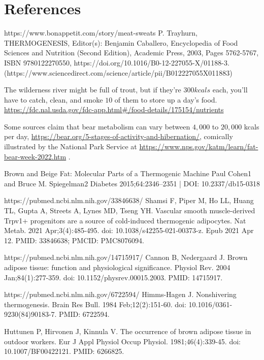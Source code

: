 \documentclass[12pt]{iopart}
\begin{document}
\section*{References}
\begin{thebibliography}{99}

https://www.bonappetit.com/story/meat-sweats
P. Trayhurn,
THERMOGENESIS,
Editor(s): Benjamin Caballero,
Encyclopedia of Food Sciences and Nutrition (Second Edition),
Academic Press,
2003,
Pages 5762-5767,
ISBN 9780122270550,
https://doi.org/10.1016/B0-12-227055-X/01188-3.
(https://www.sciencedirect.com/science/article/pii/B012227055X011883)

The wilderness river might be full of trout, but if they're $300kcals$ each, you'll have to catch, clean, and smoke $10$ of them to store up a day's food. \url{https://fdc.nal.usda.gov/fdc-app.html#/food-details/175154/nutrients}

Some sources claim that bear metabolism can vary between $4,000$ to $20,000$ kcals per day, \url{https://bear.org/5-stages-of-activity-and-hibernation/}, comically illustrated by the National Park Service at \url{https://www.nps.gov/katm/learn/fat-bear-week-2022.htm} .


Brown and Beige Fat: Molecular Parts of a Thermogenic Machine
Paul Cohen1 and Bruce M. Spiegelman2
Diabetes 2015;64:2346–2351 | DOI: 10.2337/db15-0318

https://pubmed.ncbi.nlm.nih.gov/33846638/
Shamsi F, Piper M, Ho LL, Huang TL, Gupta A, Streets A, Lynes MD, Tseng YH. 
Vascular smooth muscle-derived Trpv1+ progenitors are a source of cold-induced thermogenic adipocytes. Nat Metab. 2021 Apr;3(4):485-495. 
doi: 10.1038/s42255-021-00373-z. Epub 2021 Apr 12. PMID: 33846638; PMCID: PMC8076094.

https://pubmed.ncbi.nlm.nih.gov/14715917/
Cannon B, Nedergaard J. Brown adipose tissue: function and physiological significance. Physiol Rev. 2004 Jan;84(1):277-359. 
doi: 10.1152/physrev.00015.2003. PMID: 14715917.

https://pubmed.ncbi.nlm.nih.gov/6722594/
Himms-Hagen J. Nonshivering thermogenesis. Brain Res Bull. 1984 Feb;12(2):151-60. 
doi: 10.1016/0361-9230(84)90183-7. PMID: 6722594.

Huttunen P, Hirvonen J, Kinnula V. 
The occurrence of brown adipose tissue in outdoor workers. 
Eur J Appl Physiol Occup Physiol. 
1981;46(4):339-45. 
doi: 10.1007/BF00422121. PMID: 6266825.


\end{thebibliography}
\end{document}
